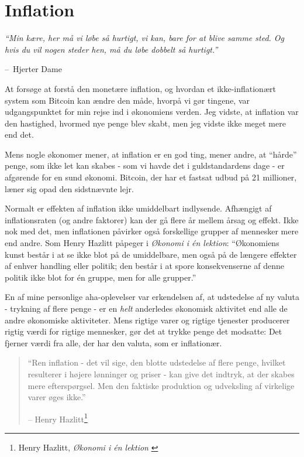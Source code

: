 \documentclass[paper=6in:9in,pagesize=pdftex,
               headinclude=on,footinclude=on,12pt]{scrbook}
\makeatletter
\newenvironment{chapquote}[2][4em]{\setlength{\@tempdima}{#1}%
   \def\chapquote@author{#2}%
   \parshape 1 \@tempdima \dimexpr\textwidth-2\@tempdima\relax%
   \itshape}{\par\normalfont\hfill--\ \chapquote@author\hspace*{\@tempdima}\par\bigskip}
\makeatother
\begin{document}
\chapter{Inflation}
\label{les:9}

\begin{chapquote}{Hjerter Dame} \enquote{Min kære, her må vi løbe så hurtigt, vi kan, bare for at blive samme sted. Og hvis du vil nogen steder hen, må du løbe dobbelt så hurtigt.} \end{chapquote}

At forsøge at forstå den monetære inflation, og hvordan et ikke-inflationært system som Bitcoin kan ændre den måde, hvorpå vi gør tingene, var udgangspunktet for min rejse ind i økonomiens verden. Jeg vidste, at inflation var den hastighed, hvormed nye penge blev skabt, men jeg vidste ikke meget mere end det.

Mens nogle økonomer mener, at inflation er en god ting, mener andre, at \enquote{hårde} penge, som ikke let kan skabes - som vi havde det i guldstandardens dage - er afgørende for en sund økonomi. Bitcoin, der har et fastsat udbud på 21 millioner, læner sig opad den sidstnævnte lejr.

Normalt er effekten af inflation ikke umiddelbart indlysende. Afhængigt af inflationsraten (og andre faktorer) kan der gå flere år mellem årsag og effekt. Ikke nok med det, men inflationen påvirker også forskellige grupper af mennesker mere end andre. Som Henry Hazlitt påpeger i \textit{Økonomi i \'en lektion}: \enquote{Økonomiens kunst består i at se ikke blot på de umiddelbare, men også på de længere effekter af enhver handling eller politik; den består i at spore konsekvenserne af denne politik ikke blot for \'en gruppe, men for alle grupper.}

En af mine personlige aha-oplevelser var erkendelsen af, at udstedelse af ny valuta - trykning af flere penge - er en \textit{helt} anderledes økonomisk aktivitet end alle de andre økonomiske aktiviteter. Mens rigtige varer og rigtige tjenester producerer rigtig værdi for rigtige mennesker, gør det at trykke penge det modsatte: Det fjerner værdi fra alle, der har den valuta, som er inflationær.\begin{quotation}\begin{samepage} \enquote{Ren inflation - det vil sige, den blotte udstedelse af flere penge, hvilket resulterer i højere lønninger og priser - kan give det indtryk, at der skabes mere efterspørgsel. Men den faktiske produktion og udveksling af virkelige varer øges ikke.} \begin{flushright} -- Henry Hazlitt\footnote{Henry Hazlitt, \textit{Økonomi i \'en lektion} \cite{hazlitt}}
\end{flushright}\end{samepage}\end{quotation}
\end{document}
